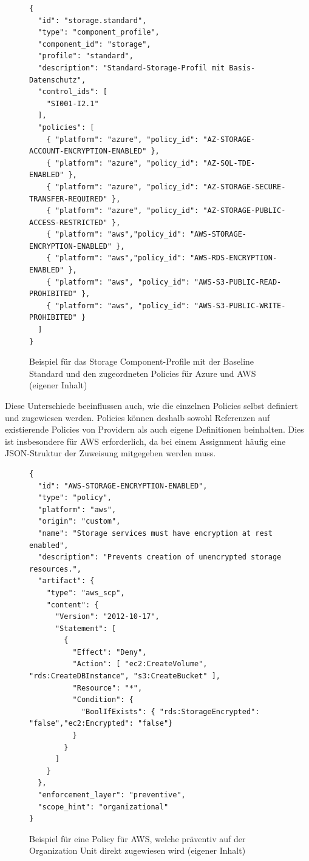 \begin{figure}[H]
\centering
\begin{lstlisting}
{
  "id": "storage.standard",
  "type": "component_profile",
  "component_id": "storage",
  "profile": "standard",
  "description": "Standard-Storage-Profil mit Basis-Datenschutz",
  "control_ids": [
    "SI001-I2.1"
  ],
  "policies": [
    { "platform": "azure", "policy_id": "AZ-STORAGE-ACCOUNT-ENCRYPTION-ENABLED" },
    { "platform": "azure", "policy_id": "AZ-SQL-TDE-ENABLED" },
    { "platform": "azure", "policy_id": "AZ-STORAGE-SECURE-TRANSFER-REQUIRED" },
    { "platform": "azure", "policy_id": "AZ-STORAGE-PUBLIC-ACCESS-RESTRICTED" },
    { "platform": "aws","policy_id": "AWS-STORAGE-ENCRYPTION-ENABLED" },
    { "platform": "aws","policy_id": "AWS-RDS-ENCRYPTION-ENABLED" },
    { "platform": "aws", "policy_id": "AWS-S3-PUBLIC-READ-PROHIBITED" },
    { "platform": "aws", "policy_id": "AWS-S3-PUBLIC-WRITE-PROHIBITED" }
  ]
}
\end{lstlisting}
\caption{Beispiel für das Storage Component-Profile mit der Baseline Standard und den zugeordneten Policies für Azure und AWS (eigener Inhalt)}
\label{fig:component-profile-sample}
\end{figure}

Diese Unterschiede beeinflussen auch, wie die einzelnen Policies selbst definiert und zugewiesen werden. Policies können deshalb sowohl Referenzen auf existierende Policies von Providern als auch eigene Definitionen beinhalten. Dies ist insbesondere für AWS erforderlich, da bei einem Assignment häufig eine JSON-Struktur der Zuweisung mitgegeben werden muss.

\begin{figure}[H]
\centering
\begin{lstlisting}
{
  "id": "AWS-STORAGE-ENCRYPTION-ENABLED",
  "type": "policy",
  "platform": "aws",
  "origin": "custom",
  "name": "Storage services must have encryption at rest enabled",
  "description": "Prevents creation of unencrypted storage resources.",
  "artifact": {
    "type": "aws_scp",
    "content": {
      "Version": "2012-10-17",
      "Statement": [
        {
          "Effect": "Deny",
          "Action": [ "ec2:CreateVolume", "rds:CreateDBInstance", "s3:CreateBucket" ],
          "Resource": "*",
          "Condition": {
            "BoolIfExists": { "rds:StorageEncrypted": "false","ec2:Encrypted": "false"}
          }
        }
      ]
    }
  },
  "enforcement_layer": "preventive",
  "scope_hint": "organizational"
}
\end{lstlisting}
\caption{Beispiel für eine Policy für AWS, welche präventiv auf der Organization Unit direkt zugewiesen wird (eigener Inhalt)}
\label{fig:policy-sample-aws}
\end{figure}

